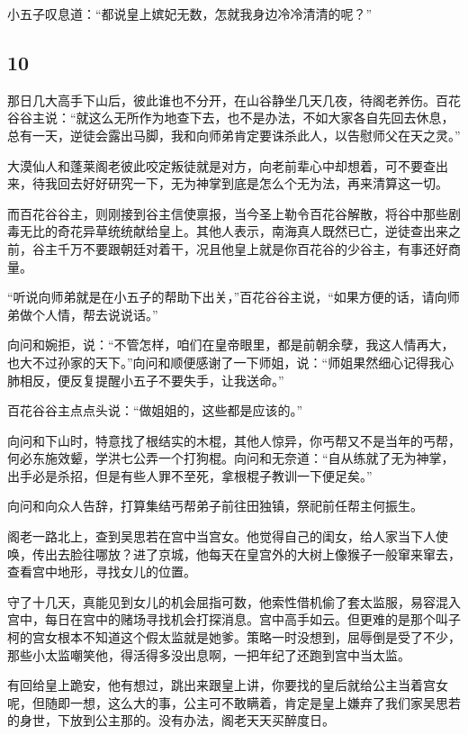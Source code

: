 小五子叹息道：“都说皇上嫔妃无数，怎就我身边冷冷清清的呢？”
\newline

{\centering\subsection{10}}

那日几大高手下山后，彼此谁也不分开，在山谷静坐几天几夜，待阁老养伤。百花谷谷主说：“就这么无所作为地查下去，也不是办法，不如大家各自先回去休息，总有一天，逆徒会露出马脚，我和向师弟肯定要诛杀此人，以告慰师父在天之灵。”

大漠仙人和蓬莱阁老彼此咬定叛徒就是对方，向老前辈心中却想着，可不要查出来，待我回去好好研究一下，无为神掌到底是怎么个无为法，再来清算这一切。

而百花谷谷主，则刚接到谷主信使禀报，当今圣上勒令百花谷解散，将谷中那些剧毒无比的奇花异草统统献给皇上。其他人表示，南海真人既然已亡，逆徒查出来之前，谷主千万不要跟朝廷对着干，况且他皇上就是你百花谷的少谷主，有事还好商量。

“听说向师弟就是在小五子的帮助下出关，”百花谷谷主说，“如果方便的话，请向师弟做个人情，帮去说说话。”

向问和婉拒，说：“不管怎样，咱们在皇帝眼里，都是前朝余孽，我这人情再大，也大不过孙家的天下。”向问和顺便感谢了一下师姐，说：“师姐果然细心记得我心肺相反，便反复提醒小五子不要失手，让我送命。”

百花谷谷主点点头说：“做姐姐的，这些都是应该的。”

向问和下山时，特意找了根结实的木棍，其他人惊异，你丐帮又不是当年的丐帮，何必东施效颦，学洪七公弄一个打狗棍。向问和无奈道：“自从练就了无为神掌，出手必是杀招，但是有些人罪不至死，拿根棍子教训一下便足矣。”

向问和向众人告辞，打算集结丐帮弟子前往田独镇，祭祀前任帮主何振生。
\newline

阁老一路北上，查到吴思若在宫中当宫女。他觉得自己的闺女，给人家当下人使唤，传出去脸往哪放？进了京城，他每天在皇宫外的大树上像猴子一般窜来窜去，查看宫中地形，寻找女儿的位置。

守了十几天，真能见到女儿的机会屈指可数，他索性借机偷了套太监服，易容混入宫中，每日在宫中的赌场寻找机会打探消息。宫中高手如云。但更难的是那个叫子柯的宫女根本不知道这个假太监就是她爹。策略一时没想到，屈辱倒是受了不少，那些小太监嘲笑他，得活得多没出息啊，一把年纪了还跑到宫中当太监。

有回给皇上跪安，他有想过，跳出来跟皇上讲，你要找的皇后就给公主当着宫女呢，但随即一想，这么大的事，公主可不敢瞒着，肯定是皇上嫌弃了我们家吴思若的身世，下放到公主那的。没有办法，阁老天天买醉度日。

